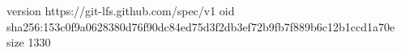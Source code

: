 version https://git-lfs.github.com/spec/v1
oid sha256:153c0f9a0628380d76f90dc84ed75d3f2db3ef72b9fb7f889b6c12b1ccd1a70e
size 1330
